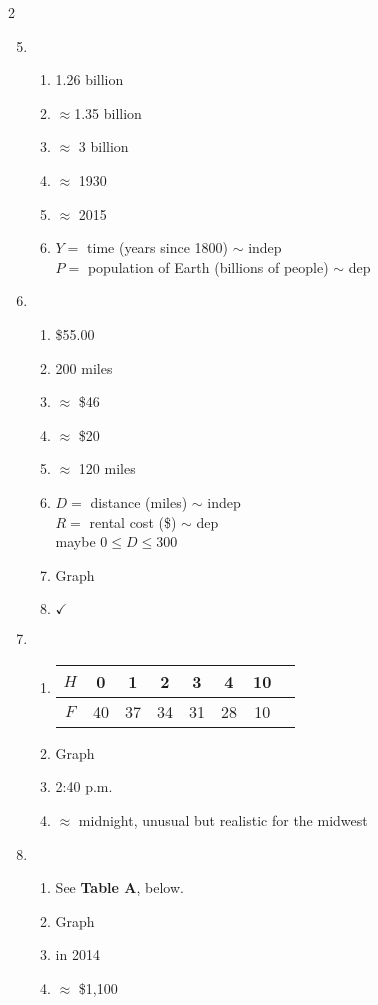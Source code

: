 \begin{multicols} {2}
\begin{enumerate}
\setcounter{enumi}{4}

\item %
\begin{enumerate}
\item 1.26 billion
\item $\approx$1.35 billion
\item $\approx$ 3 billion
\item $\approx$ 1930
\item $\approx$ 2015
\item $Y=$ time (years since 1800) $\sim$ indep \\ $P=$ population of Earth (billions of people) $\sim$ dep
\end{enumerate}

\item %
\begin{enumerate}
\item \$55.00
\item 200 miles
\item $\approx$ \$46
\item $\approx$ \$20
\item $\approx$ 120 miles
\item $D=$ distance (miles) $\sim$ indep \\ $R=$ rental cost (\$) $\sim$ dep \\ maybe $0 \le D \le 300$
\item Graph
\item $\checkmark$
\end{enumerate}

\item %
\begin{enumerate}
\item 
\begin{tabular} {|c| |c|c |c|c |c|c |c|}\hline
$H$ & 0 & 1 & 2& 3 & 4 & 10 \\ \hline
$F$ & 40 & 37 & 34 & 31 & 28 & 10  \\ \hline
\end{tabular}
\item Graph
\item 2:40 p.m.
\item $\approx$ midnight, unusual but realistic for the midwest
\end{enumerate}

\item %
\begin{enumerate}
\item  See \textbf{Table A}, below.
\item Graph
\item in 2014
\item $\approx$ \$1,100
\end{enumerate}


\end{enumerate}
\end{multicols}
